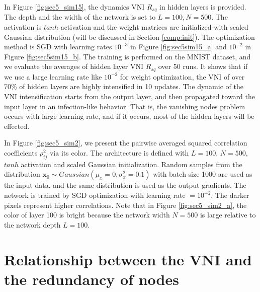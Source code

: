 In Figure \ref{fig:sec5_sim15}, the dynamics VNI $R_{sq}$ in hidden layers is provided.
The depth and the width of the network is set to $L=100, N=500$.
The activation is $tanh$ activation and the weight matrices are initialized with scaled Gaussian
distribution (will be discussed in Section \ref{comp:init}).
The optimization method is SGD with learning rates $10^{-3}$ in Figure \ref{fig:sec5sim15_a} and
$10^{-2}$ in Figure \ref{fig:sec5sim15_b}.
The training is performed on the MNIST dataset, and we evaluate the averages of hidden layer
VNI $R_{sq}$ over 50 runs.
It shows that if we use a large learning rate like $10^{-2}$ for weight optimization, the VNI of
over 70\% of hidden layers are highly intensified in 10 updates.
The dynamic of the VNI intensification starts from the output layer, and then propagated toward the
input layer in an infection-like behavior. 
That is, the vanishing nodes problem occurs with large learning rate, and if it occurs, most of the
hidden layers will be effected.

In Figure \ref{fig:sec5_sim2}, we present the pairwise averaged squared correlation coefficients
$\rho_{ij}^2$ via its color.
The architecture is defined with $L=100$, $N=500$, $tanh$ activation and scaled Gaussian initialization.
Random samples from the distribution $\mathbf{x}_0\sim Gaussian(\mu_x=0, \sigma^2_x=0.1)$
with batch size 1000 are used as the input data, and the same distribution is used as the output gradients. 
The network is trained by SGD optimization with learning rate $=10^{-2}$.
The darker pixels represent higher correlations.
Note that in Figure \ref{fig:sec5_sim2_a}, the color of layer 100 is bright because the network width
$N=500$ is large relative to the network depth $L=100$.







\section{Relationship between the VNI and the redundancy of nodes} \label{repr_redundancy}

